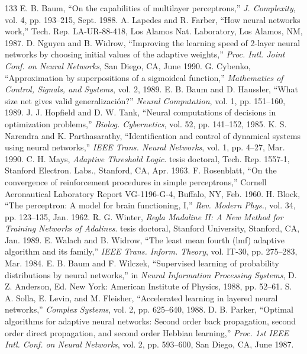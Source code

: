 \documentclass[10pt,twocolumn]{article}
\begin{document}
\begin{thebibliography}{133}
 E. B. Baum, ``On the capabilities of multilayer perceptrons,'' \textit{J. Complexity}, vol. 4, pp. 193--215, Sept. 1988.
 A. Lapedes and R. Farber, ``How neural networks work,'' Tech. Rep. LA-UR-88-418, Los Alamos Nat. Laboratory, Los Alamos, NM, 1987.
 D. Nguyen and B. Widrow, ``Improving the learning speed of 2-layer neural networks by choosing initial values of the adaptive weights,'' \textit{Proc. Intl. Joint Conf. on Neural Networks}, San Diego, CA, June 1990.
 G. Cybenko, ``Approximation by superpositions of a sigmoideal function,'' \textit{Mathematics of Control, Signals, and Systems}, vol. 2, 1989.
 E. B. Baum and D. Haussler, ``What size net gives valid generalización?'' \textit{Neural Computation}, vol. 1, pp. 151--160, 1989.
 J. J. Hopfield and D. W. Tank, ``Neural computations of decisions in optimization problems,'' \textit{Biolog. Cybernetics}, vol. 52, pp. 141--152, 1985.
 K. S. Narendra and K. Parthasarathy, ``Identification and control of dynamical systems using neural networks,'' \textit{IEEE Trans. Neural Networks}, vol. 1, pp. 4--27, Mar. 1990.
 C. H. Mays, \textit{Adaptive Threshold Logic}. tesis doctoral, Tech. Rep. 1557-1, Stanford Electron. Labs., Stanford, CA, Apr. 1963.
 F. Rosenblatt, ``On the convergence of reinforcement procedures in simple perceptrons,'' Cornell Aeronautical Laboratory Report VG-1196-G-4, Buffalo, NY, Feb. 1960.
 H. Block, ``The perceptron: A model for brain functioning, I,'' \textit{Rev. Modern Phys.}, vol. 34, pp. 123--135, Jan. 1962.
 R. G. Winter, \textit{Regla Madaline II: A New Method for Training Networks of Adalines}. tesis doctoral, Stanford University, Stanford, CA, Jan. 1989.
 E. Walach and B. Widrow, ``The least mean fourth (lmf) adaptive algorithm and its family,'' \textit{IEEE Trans. Inform. Theory}, vol. IT-30, pp. 275--283, Mar. 1984.
 E. B. Baum and F. Wilczek, ``Supervised learning of probability distributions by neural networks,'' in \textit{Neural Information Processing Systems}, D. Z. Anderson, Ed. New York: American Institute of Physics, 1988, pp. 52--61.
 S. A. Solla, E. Levin, and M. Fleisher, ``Accelerated learning in layered neural networks,'' \textit{Complex Systems}, vol. 2, pp. 625--640, 1988.
 D. B. Parker, ``Optimal algorithms for adaptive neural networks: Second order back propagation, second order direct propagation, and second order Hebbian learning,'' \textit{Proc. 1st IEEE Intl. Conf. on Neural Networks}, vol. 2, pp. 593--600, San Diego, CA, June 1987.

\end{thebibliography}
\end{document}
